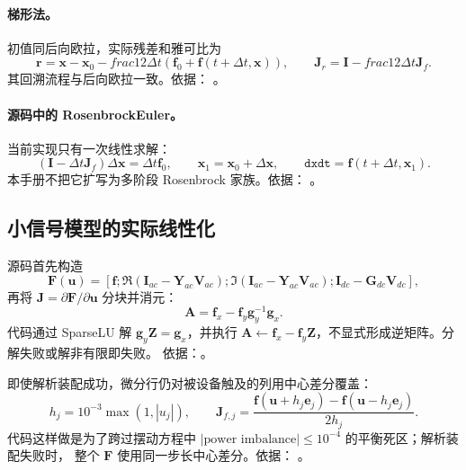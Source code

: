 \paragraph{梯形法。}
初值同后向欧拉，实际残差和雅可比为
\begin{equation}
 \mathbf r=\mathbf x-\mathbf x_0-	frac12\Delta t(\mathbf f_0+
 \mathbf f(t+\Delta t,\mathbf x)),\qquad
 \mathbf J_r=\mathbf I-	frac12\Delta t\mathbf J_f.
\end{equation}
其回溯流程与后向欧拉一致。依据：
。

\paragraph{源码中的 RosenbrockEuler。}
当前实现只有一次线性求解：
\begin{equation}
 (\mathbf I-\Delta t\mathbf J_f)\Delta\mathbf x=\Delta t\mathbf f_0,
 \qquad \mathbf x_1=\mathbf x_0+\Delta\mathbf x,
 \qquad \texttt{dxdt}=\mathbf f(t+\Delta t,\mathbf x_1).
\end{equation}
本手册不把它扩写为多阶段 Rosenbrock 家族。依据：
。

\subsection{小信号模型的实际线性化}
源码首先构造
\begin{equation}
 \mathbf F(\mathbf u)=
 [\mathbf f;\Re(\mathbf I_{ac}-\mathbf Y_{ac}\mathbf V_{ac});
 \Im(\mathbf I_{ac}-\mathbf Y_{ac}\mathbf V_{ac});
 \mathbf I_{dc}-\mathbf G_{dc}\mathbf V_{dc}],
\end{equation}
再将 $\mathbf J=\partial\mathbf F/\partial\mathbf u$ 分块并消元：
\begin{equation}
 \mathbf A=\mathbf f_x-\mathbf f_y\mathbf g_y^{-1}\mathbf g_x.
\end{equation}
代码通过 SparseLU 解 $\mathbf g_y\mathbf Z=\mathbf g_x$，并执行
$\mathbf A\leftarrow\mathbf f_x-\mathbf f_y\mathbf Z$，不显式形成逆矩阵。分解失败或解非有限即失败。
依据：。

即使解析装配成功，微分行仍对被设备触及的列用中心差分覆盖：
\begin{equation}
 h_j=10^{-3}\max(1,|u_j|),\qquad
 \mathbf J_{f,j}=\frac{\mathbf f(\mathbf u+h_j\mathbf e_j)-
 \mathbf f(\mathbf u-h_j\mathbf e_j)}{2h_j}.
\end{equation}
代码这样做是为了跨过摆动方程中 $|\text{power imbalance}|\leq10^{-4}$ 的平衡死区；解析装配失败时，
整个 $\mathbf F$ 使用同一步长中心差分。依据：
。

